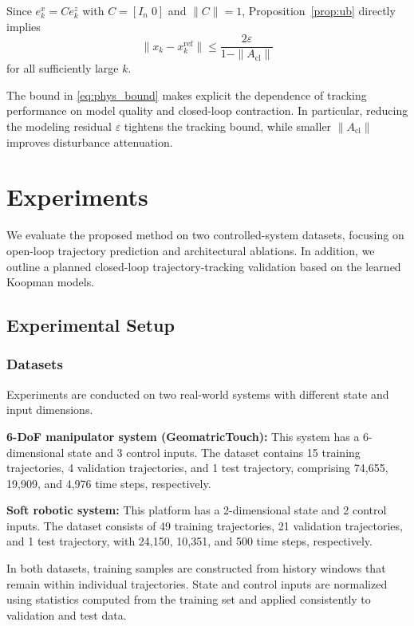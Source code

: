 \documentclass[journal]{IEEEtran}
\begin{document}
Since $e_k^x = C e_k^z$ with $C=[I_n\;0]$ and $\|C\|=1$, Proposition~\ref{prop:ub} directly implies
\begin{equation}
    \|x_k - x_k^{\mathrm{ref}}\|
    \leq
    \frac{2\varepsilon}{1 - \|A_{\mathrm{cl}}\|}
    \label{eq:phys_bound}
\end{equation}
for all sufficiently large $k$.

The bound in \eqref{eq:phys_bound} makes explicit the dependence of tracking performance on model quality and closed-loop contraction. In particular, reducing the modeling residual $\varepsilon$ tightens the tracking bound, while smaller $\|A_{\mathrm{cl}}\|$ improves disturbance attenuation.

\section{Experiments}
\label{sec:experiments}

We evaluate the proposed method on two controlled-system datasets, focusing on open-loop trajectory prediction and architectural ablations. In addition, we outline a planned closed-loop trajectory-tracking validation based on the learned Koopman models.

\subsection{Experimental Setup}

\subsubsection{Datasets}

Experiments are conducted on two real-world systems with different state and input dimensions.

\textbf{6-DoF manipulator system (GeomatricTouch):}
This system has a 6-dimensional state and 3 control inputs. The dataset contains 15 training trajectories, 4 validation trajectories, and 1 test trajectory, comprising 74,655, 19,909, and 4,976 time steps, respectively.

\textbf{Soft robotic system:}
This platform has a 2-dimensional state and 2 control inputs. The dataset consists of 49 training trajectories, 21 validation trajectories, and 1 test trajectory, with 24,150, 10,351, and 500 time steps, respectively.

In both datasets, training samples are constructed from history windows that remain within individual trajectories. State and control inputs are normalized using statistics computed from the training set and applied consistently to validation and test data.
\end{document}
